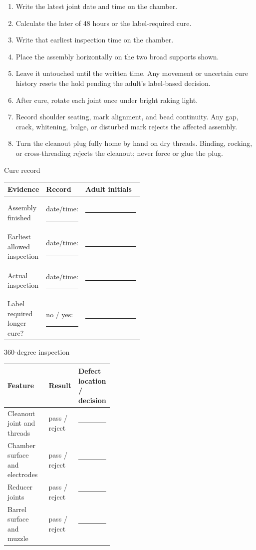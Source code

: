 \begin{enumerate}
\item Write the latest joint date and time on the chamber.
\item Calculate the later of 48 hours or the label-required cure.
\item Write that earliest inspection time on the chamber.
\item Place the assembly horizontally on the two broad supports shown.
\item Leave it untouched until the written time. Any movement or uncertain
cure history resets the hold pending the adult's label-based decision.
\item After cure, rotate each joint once under bright raking light.
\item Record shoulder seating, mark alignment, and bead continuity. Any gap,
crack, whitening, bulge, or disturbed mark rejects the affected assembly.
\item Turn the cleanout plug fully home by hand on dry threads. Binding,
rocking, or cross-threading rejects the cleanout; never force or glue the plug.
\end{enumerate}

\begin{teloscard}{Cure record}
\begin{tabularx}{\linewidth}{@{}p{0.28\linewidth}p{0.26\linewidth}L@{}}
\toprule
\textbf{Evidence} & \textbf{Record} & \textbf{Adult initials}\\
\midrule
Assembly finished & date/time: \rule{0.85in}{0.4pt} & \rule{0.7in}{0.4pt}\\
Earliest allowed inspection & date/time: \rule{0.85in}{0.4pt} & \rule{0.7in}{0.4pt}\\
Actual inspection & date/time: \rule{0.85in}{0.4pt} & \rule{0.7in}{0.4pt}\\
Label required longer cure? & no / yes: \rule{0.55in}{0.4pt} & \rule{0.7in}{0.4pt}\\
\bottomrule
\end{tabularx}
\end{teloscard}

\begin{teloscard}{360-degree inspection}
\begin{tabularx}{\linewidth}{@{}L p{0.15\linewidth}p{0.27\linewidth}@{}}
\toprule
\textbf{Feature} & \textbf{Result} & \textbf{Defect location / decision}\\
\midrule
Cleanout joint and threads & pass / reject & \rule{1.25in}{0.4pt}\\
Chamber surface and electrodes & pass / reject & \rule{1.25in}{0.4pt}\\
Reducer joints & pass / reject & \rule{1.25in}{0.4pt}\\
Barrel surface and muzzle & pass / reject & \rule{1.25in}{0.4pt}\\
\bottomrule
\end{tabularx}
\end{teloscard}

